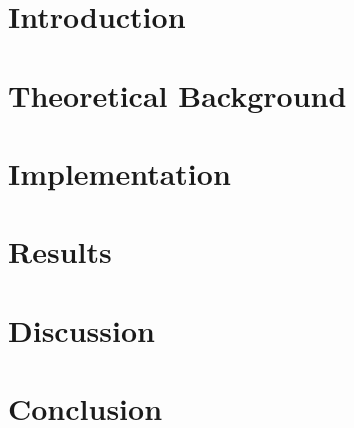\documentclass[english]{tauthesis}
\begin{document}


\mainmatter


\chapter{Introduction}%
\label{ch:introduction}


\chapter{Theoretical Background}
\label{ch:background}


\chapter{Implementation}%
\label{ch:methodologies}


\chapter{Results}%
\label{ch:results}


\chapter{Discussion}%
\label{ch:discussion}


\chapter{Conclusion}%
\label{ch:conclusion}




\printbibliography[heading=bibintoc]



\begin{appendices}



\end{appendices}
\end{document}
